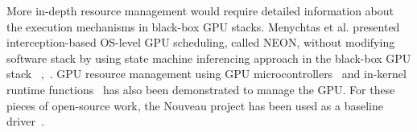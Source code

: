 More in-depth resource management would require detailed information about the execution mechanisms in black-box GPU stacks. Menychtas et al. presented interception-based OS-level GPU scheduling, called NEON, without modifying software stack by using state machine inferencing approach in the black-box GPU stack ~\cite{menychtas2013enabling},~\cite{neon}. 
GPU resource management using GPU microcontrollers~\cite{fujii:apsys2013} and in-kernel runtime functions~\cite{kato:gdev} has also been demonstrated to manage the GPU.
For these pieces of open-source work, the Nouveau project has been used as a baseline driver~\cite{nouveau}.
